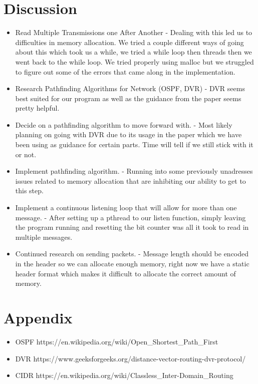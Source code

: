 \documentclass{article}
\begin{document}
\section*{Discussion}
\begin{itemize}
\item Read Multiple Transmissions one After Another - Dealing with this led us to difficulties in memory allocation. We tried a couple different ways of going about this which took us a while, we tried a while loop then threads then we went back to the while loop. We tried properly using malloc but we struggled to figure out some of the errors that came along in the implementation. 
\item Research Pathfinding Algorithms for Network (OSPF, DVR) - DVR seems best suited for our program as well as the guidance from the paper seems pretty helpful. 
\item Decide on a pathfinding algorithm to move forward with. - Most likely planning on going with DVR due to its usage in the paper which we have been using as guidance for certain parts. Time will tell if we still stick with it or not. 
\item Implement pathfinding algorithm. - Running into some previously unadresses issues related to memory allocation that are inhibiting our ability to get to this step. 
\item Implement a continuous listening loop that will allow for more than one message. - After setting up a pthread to our listen function, simply leaving the program running and resetting the bit counter was all it took to read in multiple messages.
\item Continued research on sending packets. - Message length should be encoded in the header so we can allocate enough memory, right now we have a static header format which makes it difficult to allocate the correct amount of memory.

\end{itemize}
\section*{Appendix}
\begin{itemize}
\item OSPF https://en.wikipedia.org/wiki/Open\_Shortest\_Path\_First
\item DVR https://www.geeksforgeeks.org/distance-vector-routing-dvr-protocol/
\item CIDR https://en.wikipedia.org/wiki/Classless\_Inter-Domain\_Routing
\end{itemize}
\end{document}
